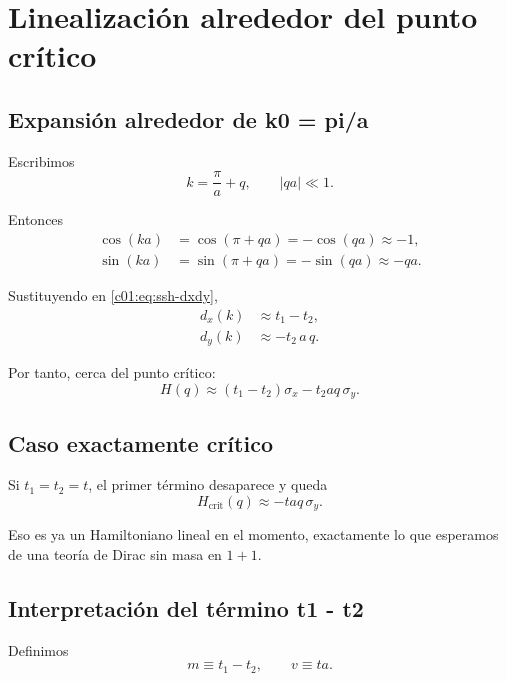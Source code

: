 \section{Linealización alrededor del punto crítico}

\subsection{Expansión alrededor de k0 = pi/a}

Escribimos
\begin{equation}
k = \frac{\pi}{a}+q,
\qquad |q a|\ll 1.
\end{equation}

Entonces
\begin{align}
\cos(ka)
&=
\cos(\pi+qa)
=
-\cos(qa)
\approx -1,
\\
\sin(ka)
&=
\sin(\pi+qa)
=
-\sin(qa)
\approx -qa.
\end{align}

Sustituyendo en \eqref{c01:eq:ssh-dxdy},
\begin{align}
d_x(k)
&\approx t_1-t_2,
\\
d_y(k)
&\approx -t_2\, a\, q.
\end{align}

Por tanto, cerca del punto crítico:
\begin{equation}
H(q)\approx (t_1-t_2)\sigma_x - t_2 a q\,\sigma_y.
\label{c01:eq:ssh-linear}
\end{equation}

\subsection{Caso exactamente crítico}

Si \(t_1=t_2=t\), el primer término desaparece y queda
\begin{equation}
H_{\text{crit}}(q)\approx - t a q\, \sigma_y.
\label{c01:eq:ssh-critical-linear}
\end{equation}

Eso es ya un Hamiltoniano lineal en el momento, exactamente lo que esperamos de una teoría de Dirac sin masa en \(1+1\).

\subsection{Interpretación del término t1 - t2}

Definimos
\begin{equation}
m \equiv t_1-t_2,
\qquad
v \equiv t a.
\end{equation}


